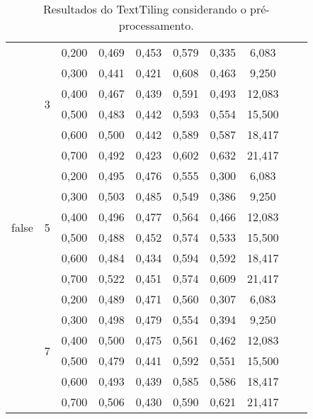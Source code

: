 \documentclass{article}
\begin{document}
\begin{table}[!h]
\begin{tabular}{|c|c|c|c|c|c|c|c|c|c|}
\multirow{18}{*}{false} & \multirow{6}{*}{3} 
      & 0,200    & 0,469 & 0,453 & 0,579 & 0,335 & 6,083        \\ \cline{3-8}
     && 0,300    & 0,441 & 0,421 & 0,608 & 0,463 & 9,250        \\ \cline{3-8}
     && 0,400    & 0,467 & 0,439 & 0,591 & 0,493 & 12,083       \\ \cline{3-8}
     && 0,500    & 0,483 & 0,442 & 0,593 & 0,554 & 15,500       \\ \cline{3-8}
     && 0,600    & 0,500 & 0,442 & 0,589 & 0,587 & 18,417       \\ \cline{3-8}
     && 0,700    & 0,492 & 0,423 & 0,602 & 0,632 & 21,417       \\ \cline{2-8}
& \multirow{6}{*}{5} 
      & 0,200    & 0,495 & 0,476 & 0,555 & 0,300 & 6,083        \\ \cline{3-8}
     && 0,300    & 0,503 & 0,485 & 0,549 & 0,386 & 9,250        \\ \cline{3-8}
     && 0,400    & 0,496 & 0,477 & 0,564 & 0,466 & 12,083       \\ \cline{3-8}
     && 0,500    & 0,488 & 0,452 & 0,574 & 0,533 & 15,500       \\ \cline{3-8}
     && 0,600    & 0,484 & 0,434 & 0,594 & 0,592 & 18,417       \\ \cline{3-8}
     && 0,700    & 0,522 & 0,451 & 0,574 & 0,609 & 21,417       \\ \cline{2-8}
& \multirow{6}{*}{7} 
      & 0,200    & 0,489 & 0,471 & 0,560 & 0,307 & 6,083        \\ \cline{3-8}
     && 0,300    & 0,498 & 0,479 & 0,554 & 0,394 & 9,250        \\ \cline{3-8}
     && 0,400    & 0,500 & 0,475 & 0,561 & 0,462 & 12,083       \\ \cline{3-8}
     && 0,500    & 0,479 & 0,441 & 0,592 & 0,551 & 15,500       \\ \cline{3-8}
     && 0,600    & 0,493 & 0,439 & 0,585 & 0,586 & 18,417       \\ \cline{3-8}
     && 0,700    & 0,506 & 0,430 & 0,590 & 0,621 & 21,417       \\ \hline 
 \end{tabular}  
\caption{Resultados do TextTiling considerando o pré-processamento.}
\end{table} 








\end{document}
